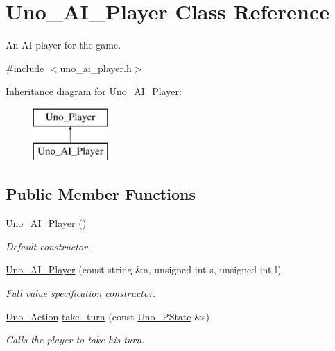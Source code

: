 \hypertarget{class_uno___a_i___player}{
\section{\-Uno\-\_\-\-A\-I\-\_\-\-Player \-Class \-Reference}
\label{class_uno___a_i___player}
}


\-An \-A\-I player for the game.  




{\ttfamily \#include $<$uno\-\_\-ai\-\_\-player.\-h$>$}

\-Inheritance diagram for \-Uno\-\_\-\-A\-I\-\_\-\-Player\-:\begin{figure}[H]
\begin{center}
\leavevmode
\includegraphics[height=2.000000cm]{class_uno___a_i___player}
\end{center}
\end{figure}
\subsection*{\-Public \-Member \-Functions}
\begin{DoxyCompactItemize}
\item 
\hyperlink{class_uno___a_i___player_ae977868f52c315663174b5c4943ac9ef}{\-Uno\-\_\-\-A\-I\-\_\-\-Player} ()
\begin{DoxyCompactList}\small\item\em \-Default constructor. \end{DoxyCompactList}\item 
\hyperlink{class_uno___a_i___player_ab16352005d98a759d298d05afdaaea9e}{\-Uno\-\_\-\-A\-I\-\_\-\-Player} (const string \&n, unsigned int s, unsigned int l)
\begin{DoxyCompactList}\small\item\em \-Full value specification constructor. \end{DoxyCompactList}\item 
\hyperlink{class_uno___action}{\-Uno\-\_\-\-Action} \hyperlink{class_uno___a_i___player_a46dd95e2b2ff44fa0b5cc80fb1d66605}{take\-\_\-turn} (const \hyperlink{class_uno___p_state}{\-Uno\-\_\-\-P\-State} \&s)
\begin{DoxyCompactList}\small\item\em \-Calls the player to take his turn. \end{DoxyCompactList}\end{DoxyCompactItemize}
